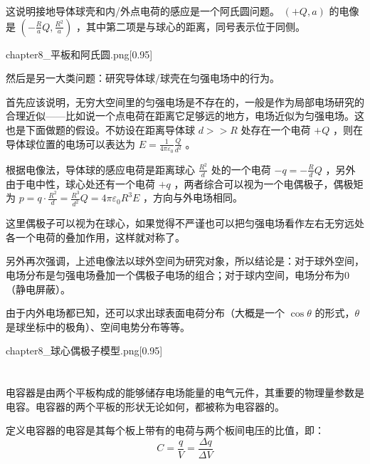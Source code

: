 这说明接地导体球壳和内/外点电荷的感应是一个阿氏圆问题。 $(+Q,a)$ 的电像是 $(-\frac{R}{a}Q,\frac{R^2}{a})$ ，其中第二项是与球心的距离，同号表示位于同侧。

\begin{singlefigure}[平板和阿氏圆]{chapter8_平板和阿氏圆.png}[0.95]
\end{singlefigure}

然后是另一大类问题：研究导体球/球壳在匀强电场中的行为。

首先应该说明，无穷大空间里的匀强电场是不存在的，一般是作为局部电场研究的合理近似——比如说一个点电荷在距离它足够远的地方，电场近似为匀强电场。这也是下面做题的假设。不妨设在距离导体球 $d >> R$ 处存在一个电荷 $+Q$ ，则在导体球位置的电场可以表达为 $E = \frac{1}{4\pi \varepsilon_0} \frac{Q}{d^2}$ 。

根据电像法，导体球的感应电荷是距离球心 $\frac{R^2}{d}$ 处的一个电荷 $-q = -\frac{R}{d}Q$ ，另外由于电中性，球心处还有一个电荷 $+q$ ，两者综合可以视为一个电偶极子，偶极矩为 $p = q \cdot \frac{R^2}{d} = \frac{R^3}{d^2}Q = 4\pi \varepsilon_0 R^3 E$ ，方向与外电场相同。

这里偶极子可以视为在球心，如果觉得不严谨也可以把匀强电场看作左右无穷远处各一个电荷的叠加作用，这样就对称了。

另外再次强调，上述电像法以球外空间为研究对象，所以结论是：对于球外空间，电场分布是匀强电场叠加一个偶极子电场的组合；对于球内空间，电场分布为0（静电屏蔽）。

由于内外电场都已知，还可以求出球表面电荷分布（大概是一个 $\cos \theta$ 的形式，$\theta$ 是球坐标中的极角）、空间电势分布等等。

\begin{singlefigure}[球心偶极子模型]{chapter8_球心偶极子模型.png}[0.95]
\end{singlefigure}

\section[电容与电容器]{}
\subsection[定义与计算]{}
电容器是由两个平板构成的能够储存电场能量的电气元件，其重要的物理量参数是电容。电容器的两个平板的形状无论如何，都被称为电容器的。

定义电容器的电容是其每个板上带有的电荷与两个板间电压的比值，即：
\[C=\dfrac{q}{V}=\dfrac{\Delta q}{\Delta V}\]

